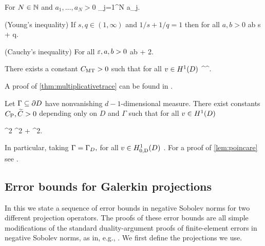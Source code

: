 \bit
\item For $N \in \mathbb N$ and $a_1,\ldots,a_N > 0$
\beq\label{eq:simple}
 \leq \sum_{j=1}^N a_j.
\eeq
\item (Young's inequality) If $s,q \in (1,\infty)$ and $1/s + 1/q = 1$ then for all $a,b > 0$
  \beq\label{eq:young}
ab \leq {}s + q.
\eeq
\item (Cauchy's inequality) For all $\varepsilon,a,b > 0$
  \beq\label{eq:cauchy}
  ab \leq {} + 2.
\eeq
  \eit
  




\label{thm:multiplicativetrace}%
There exists a constant $C_{\mathrm{MT}} > 0$ such that for all $v \in \HoD$
\beqs
{} \leq \CMT {}^\half {}^\half.
\eeqs
\enth

A proof of \cref{thm:multiplicativetrace} can be found in \cite[Last formula on p. 41]{Gr:85}.

\label{lem:poincare}
Let $\Gamma \subseteq\partial D$ have nonvanishing $d-1$-dimensional measure. There exist constants $C_{\mathrm{P}},\widetilde{C} > 0$ depending only on $D$ and $\Gamma$ such that for all $v \in \HoD$

\beqs
{}^2 \leq \CP {}^2 + \Ctilde {}^2.
\eeqs

In particular, taking $\Gamma = \Gamma_{D},$ for all $v \in \HozDD$
\beq\label{eq:poincare}
 \leq \CP {}.
\eeq
\ele
For a proof of \cref{lem:poincare} see \cite[Lemma A.14]{ToWi:05}.


\subsection{Error bounds for Galerkin projections}\label{sec:errgalerkin}
In this  we state a sequence of error bounds in negative Sobolev norms for two different projection operators. The proofs of these error bounds are all simple modifications of the standard duality-argument proofs of finite-element errors in negative Sobolev norms, as in, e.g., \cite[Theorem 5.8.3]{BrSc:08}.
We first define the projections we use.

